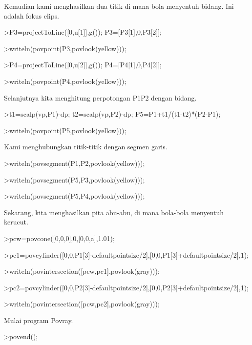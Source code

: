 \documentclass[
]{book}
\begin{document}
Kemudian kami menghasilkan dua titik di mana bola menyentuh bidang. Ini adalah fokus elips.

\textgreater P3=projectToLine({[}0,u{[}1{]}{]},g()); P3={[}P3{[}1{]},0,P3{[}2{]}{]};

\textgreater writeln(povpoint(P3,povlook(yellow)));

\textgreater P4=projectToLine({[}0,u{[}2{]}{]},g()); P4={[}P4{[}1{]},0,P4{[}2{]}{]};

\textgreater writeln(povpoint(P4,povlook(yellow)));

Selanjutnya kita menghitung perpotongan P1P2 dengan bidang.

\textgreater t1=scalp(vp,P1)-dp; t2=scalp(vp,P2)-dp; P5=P1+t1/(t1-t2)*(P2-P1);

\textgreater writeln(povpoint(P5,povlook(yellow)));

Kami menghubungkan titik-titik dengan segmen garis.

\textgreater writeln(povsegment(P1,P2,povlook(yellow)));

\textgreater writeln(povsegment(P5,P3,povlook(yellow)));

\textgreater writeln(povsegment(P5,P4,povlook(yellow)));

Sekarang, kita menghasilkan pita abu-abu, di mana bola-bola menyentuh kerucut.

\textgreater pcw=povcone({[}0,0,0{]},0,{[}0,0,a{]},1.01);

\textgreater pc1=povcylinder({[}0,0,P1{[}3{]}-defaultpointsize/2{]},{[}0,0,P1{[}3{]}+defaultpointsize/2{]},1);

\textgreater writeln(povintersection({[}pcw,pc1{]},povlook(gray)));

\textgreater pc2=povcylinder({[}0,0,P2{[}3{]}-defaultpointsize/2{]},{[}0,0,P2{[}3{]}+defaultpointsize/2{]},1);

\textgreater writeln(povintersection({[}pcw,pc2{]},povlook(gray)));

Mulai program Povray.

\textgreater povend();
\end{document}
